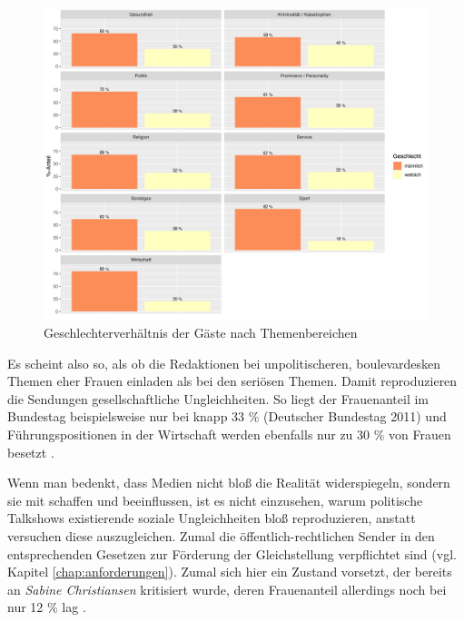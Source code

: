 \begin{figure}[ht]
	\centering
	\includegraphics[width=1\textwidth]{daten/grafiken/plot_geschlechterverhaeltnis_themen.png}
	\caption{Geschlechterverhältnis der Gäste nach Themenbereichen}
	\label{plot:geschlechterverhaeltnis_themen}
\end{figure}

Es scheint also so, als ob die Redaktionen bei unpolitischeren, boulevardesken Themen eher Frauen einladen als bei den seriösen Themen. Damit reproduzieren die Sendungen gesellschaftliche Ungleichheiten. So liegt der Frauenanteil im Bundestag beispielsweise  nur bei knapp 33 \% (Deutscher Bundestag 2011) und Führungspositionen in der Wirtschaft werden ebenfalls nur zu 30 \% von Frauen besetzt \parencite{hostFuhrungskrafteMonitor20122012}.

Wenn man bedenkt, dass Medien nicht bloß die Realität widerspiegeln, sondern sie mit schaffen und beeinflussen, ist es nicht einzusehen, warum politische Talkshows existierende soziale Ungleichheiten bloß reproduzieren, anstatt versuchen diese auszugleichen. Zumal die öffentlich-rechtlichen Sender in den entsprechenden Gesetzen zur Förderung der Gleichstellung verpflichtet sind (vgl. Kapitel \vref{chap:anforderungen}). Zumal sich hier ein Zustand vorsetzt, der bereits an \textit{Sabine Christiansen} kritisiert wurde, deren Frauenanteil allerdings noch bei nur 12 \% lag \parencite[3]{muellerSchaubuehneFuerEinflussreichen2006}.

